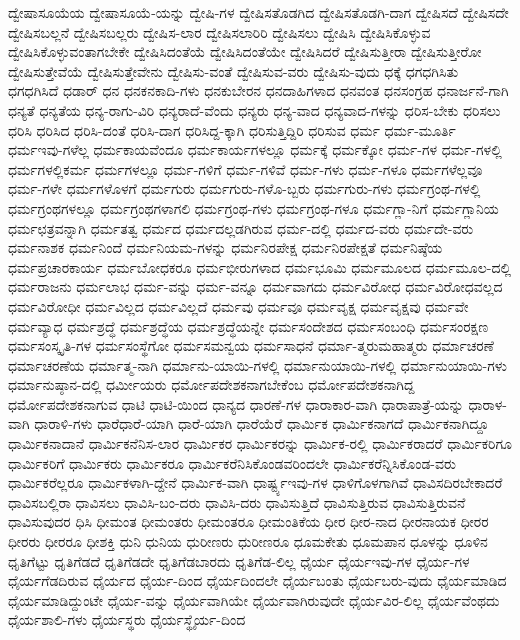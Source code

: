 {ದ್ವೇಷಾಸೂಯೆಯ
ದ್ವೇಷಾಸೂಯೆ-ಯನ್ನು
ದ್ವೇಷಿ-ಗಳ
ದ್ವೇಷಿಸತೊಡಗಿದ
ದ್ವೇಷಿಸತೊಡಗಿ-ದಾಗ
ದ್ವೇಷಿಸದೆ
ದ್ವೇಷಿಸದೇ
ದ್ವೇಷಿಸಬಲ್ಲನೆ
ದ್ವೇಷಿಸಬಲ್ಲರು
ದ್ವೇಷಿಸ-ಲಾರ
ದ್ವೇಷಿಸಲಾರಿರಿ
ದ್ವೇಷಿಸಲು
ದ್ವೇಷಿಸಿ
ದ್ವೇಷಿಸಿಕೊಳ್ಳುವ
ದ್ವೇಷಿಸಿಕೊಳ್ಳುವಂತಾಗಬೇಕೇ
ದ್ವೇಷಿಸಿದಂತೆಯೆ
ದ್ವೇಷಿಸಿದಂತೆಯೇ
ದ್ವೇಷಿಸಿದರೆ
ದ್ವೇಷಿಸುತ್ತೀರಾ
ದ್ವೇಷಿಸುತ್ತೀರೋ
ದ್ವೇಷಿಸುತ್ತೇವೆಯೆ
ದ್ವೇಷಿಸುತ್ತೇವೇನು
ದ್ವೇಷಿಸು-ವಂತೆ
ದ್ವೇಷಿಸುವ-ವರು
ದ್ವೇಷಿಸು-ವುದು
ಧಕ್ಕೆ
ಧಗಧಗಿಸಿತು
ಧಗಧಗಿಸಿದೆ
ಧಡಾರ್
ಧನ
ಧನಕನಕಾದಿ-ಗಳು
ಧನಕುಬೇರನ
ಧನದಾಹಿಗಳಾದ
ಧನವಂತ
ಧನಸಂಗ್ರಹ
ಧನಾರ್ಜನೆ-ಗಾಗಿ
ಧನ್ಯತೆ
ಧನ್ಯತೆಯ
ಧನ್ಯ-ರಾಗು-ವಿರಿ
ಧನ್ಯರಾದೆ-ವೆಂದು
ಧನ್ಯರು
ಧನ್ಯ-ವಾದ
ಧನ್ಯವಾದ-ಗಳನ್ನು
ಧರಿಸ-ಬೇಕು
ಧರಿಸಲು
ಧರಿಸಿ
ಧರಿಸಿದ
ಧರಿಸಿ-ದಂತೆ
ಧರಿಸಿ-ದಾಗ
ಧರಿಸಿದ್ದ-ಕ್ಕಾಗಿ
ಧರಿಸುತ್ತಿದ್ದಿರಿ
ಧರಿಸುವ
ಧರ್ಮ
ಧರ್ಮ-ಮೂರ್ತಿ
ಧರ್ಮಇವು-ಗಳೆಲ್ಲ
ಧರ್ಮಕಾಯವೆಂದೂ
ಧರ್ಮಕಾರ್ಯಗಳಲ್ಲೂ
ಧರ್ಮಕ್ಕೆ
ಧರ್ಮಕ್ಕೋ
ಧರ್ಮ-ಗಳ
ಧರ್ಮ-ಗಳಲ್ಲಿ
ಧರ್ಮಗಳಲ್ಲಿಕರ್ಮ
ಧರ್ಮಗಳಲ್ಲೂ
ಧರ್ಮ-ಗಳಿಗೆ
ಧರ್ಮ-ಗಳಿವೆ
ಧರ್ಮ-ಗಳು
ಧರ್ಮ-ಗಳೂ
ಧರ್ಮಗಳೆಲ್ಲವೂ
ಧರ್ಮ-ಗಳೇ
ಧರ್ಮಗಳೊಳಗೆ
ಧರ್ಮಗುರು
ಧರ್ಮಗುರು-ಗಳೊ-ಬ್ಬರು
ಧರ್ಮಗುರು-ಗಳು
ಧರ್ಮಗ್ರಂಥ-ಗಳಲ್ಲಿ
ಧರ್ಮಗ್ರಂಥಗಳಲ್ಲೂ
ಧರ್ಮಗ್ರಂಥಗಳಾಗಲಿ
ಧರ್ಮಗ್ರಂಥ-ಗಳು
ಧರ್ಮಗ್ರಂಥ-ಗಳೂ
ಧರ್ಮಗ್ಲಾ-ನಿಗೆ
ಧರ್ಮಗ್ಲಾನಿಯ
ಧರ್ಮಛತ್ರವನ್ನಾಗಿ
ಧರ್ಮತತ್ವ
ಧರ್ಮದ
ಧರ್ಮದಲ್ಲಡಗಿರುವ
ಧರ್ಮ-ದಲ್ಲಿ
ಧರ್ಮದ-ವರು
ಧರ್ಮದೇ-ವರು
ಧರ್ಮನಾಶಕ
ಧರ್ಮನಿಂದೆ
ಧರ್ಮನಿಯಮ-ಗಳನ್ನು
ಧರ್ಮನಿರಪೇಕ್ಷ
ಧರ್ಮನಿರಪೇಕ್ಷತೆ
ಧರ್ಮನಿಷ್ಠೆಯ
ಧರ್ಮಪ್ರಚಾರಕಾರ್ಯ
ಧರ್ಮಬೋಧಕರೂ
ಧರ್ಮಭೀರುಗಳಾದ
ಧರ್ಮಭೂಮಿ
ಧರ್ಮಮೂಲದ
ಧರ್ಮಮೂಲ-ದಲ್ಲಿ
ಧರ್ಮರಾಜನು
ಧರ್ಮಲಾಭ
ಧರ್ಮ-ವನ್ನು
ಧರ್ಮ-ವನ್ನೂ
ಧರ್ಮವಾಗದು
ಧರ್ಮವಿರೋಧ
ಧರ್ಮವಿರೋಧವಲ್ಲದ
ಧರ್ಮವಿರೋಧೀ
ಧರ್ಮವಿಲ್ಲದ
ಧರ್ಮವಿಲ್ಲದೆ
ಧರ್ಮವು
ಧರ್ಮವೂ
ಧರ್ಮವೃಕ್ಷ
ಧರ್ಮವೃಕ್ಷವು
ಧರ್ಮವೇ
ಧರ್ಮವ್ಯಾಧ
ಧರ್ಮಶ್ರದ್ಧೆ
ಧರ್ಮಶ್ರದ್ಧೆಯ
ಧರ್ಮಶ್ರದ್ಧೆಯನ್ನೇ
ಧರ್ಮಸಂದೇಶದ
ಧರ್ಮಸಂಬಂಧಿ
ಧರ್ಮಸಂರಕ್ಷಣ
ಧರ್ಮಸಂಸ್ಕೃತಿ-ಗಳ
ಧರ್ಮಸಂಸ್ಥೆಗೋ
ಧರ್ಮಸಮನ್ವಯ
ಧರ್ಮಸಾಧನೆ
ಧರ್ಮಾ-ತ್ಮರುಮಹಾತ್ಮರು
ಧರ್ಮಾಚರಣೆ
ಧರ್ಮಾಚರಣೆಯ
ಧರ್ಮಾತ್ಮ-ನಾಗಿ
ಧರ್ಮಾನು-ಯಾಯಿ-ಗಳಲ್ಲಿ
ಧರ್ಮಾನುಯಾಯಿ-ಗಳಲ್ಲಿ
ಧರ್ಮಾನುಯಾಯಿ-ಗಳು
ಧರ್ಮಾನುಷ್ಠಾನ-ದಲ್ಲಿ
ಧರ್ಮೀಯರು
ಧರ್ಮೋಪದೇಶಕನಾಗಬೇಕೆಂಬ
ಧರ್ಮೋಪದೇಶಕನಾಗಿದ್ದ
ಧರ್ಮೋಪದೇಶಕನಾಗುವ
ಧಾಟಿ
ಧಾಟಿ-ಯಿಂದ
ಧಾನ್ಯದ
ಧಾರಣೆ-ಗಳ
ಧಾರಾಕಾರ-ವಾಗಿ
ಧಾರಾಪಾತ್ರೆ-ಯನ್ನು
ಧಾರಾಳ-ವಾಗಿ
ಧಾರಾಳಿ-ಗಳು
ಧಾರೆಧಾರೆ-ಯಾಗಿ
ಧಾರೆ-ಯಾಗಿ
ಧಾರೆಯೆರೆ
ಧಾರ್ಮಿಕ
ಧಾರ್ಮಿಕನಾಗದೆ
ಧಾರ್ಮಿಕನಾಗಿದ್ದೂ
ಧಾರ್ಮಿಕನಾದಾನೆ
ಧಾರ್ಮಿಕನೆನಿಸ-ಲಾರ
ಧಾರ್ಮಿಕರ
ಧಾರ್ಮಿಕರನ್ನು
ಧಾರ್ಮಿಕ-ರಲ್ಲಿ
ಧಾರ್ಮಿಕರಾದರೆ
ಧಾರ್ಮಿಕರಿಗೂ
ಧಾರ್ಮಿಕರಿಗೆ
ಧಾರ್ಮಿಕರು
ಧಾರ್ಮಿಕರೂ
ಧಾರ್ಮಿಕರೆನಿಸಿಕೊಂಡವರಿಂದಲೇ
ಧಾರ್ಮಿಕರೆನ್ನಿಸಿಕೊಂಡ-ವರು
ಧಾರ್ಮಿಕರೆಲ್ಲರೂ
ಧಾರ್ಮಿಕಳಾಗಿ-ದ್ದೇನೆ
ಧಾರ್ಮಿಕ-ವಾಗಿ
ಧಾರ್ಷ್ಟ್ಯಇವು-ಗಳ
ಧಾಳಿಗೊಳಗಾಗಿವೆ
ಧಾವಿಸದಿರಬೇಕಾದರೆ
ಧಾವಿಸಬಲ್ಲಿರಾ
ಧಾವಿಸಲು
ಧಾವಿಸಿ-ಬಂ-ದರು
ಧಾವಿಸಿ-ದರು
ಧಾವಿಸುತ್ತಿದೆ
ಧಾವಿಸುತ್ತಿರುವ
ಧಾವಿಸುತ್ತಿರುವನೆ
ಧಾವಿಸುವುದರ
ಧಿಸಿ
ಧೀಮಂತ
ಧೀಮಂತರು
ಧೀಮಂತರೂ
ಧೀಮಂತಿಕೆಯ
ಧೀರ
ಧೀರ-ನಾದ
ಧೀರನಾಯಕ
ಧೀರರ
ಧೀರರು
ಧೀರರೂ
ಧೀಶಕ್ತಿ
ಧುನಿ
ಧುನಿಯ
ಧುರೀಣರು
ಧುರೀಣರೂ
ಧೂಮಕೇತು
ಧೂಮಪಾನ
ಧೂಳನ್ನು
ಧೂಳಿನ
ಧೃತಿಗೆಟ್ಟು
ಧೃತಿಗೆಡದೆ
ಧೃತಿಗೆಡದೇ
ಧೃತಿಗೆಡಬಾರದು
ಧೃತಿಗೆಡ-ಲಿಲ್ಲ
ಧೈರ್ಯ
ಧೈರ್ಯಇವು-ಗಳ
ಧೈರ್ಯ-ಗಳ
ಧೈರ್ಯಗೆಡದಿರುವ
ಧೈರ್ಯದ
ಧೈರ್ಯ-ದಿಂದ
ಧೈರ್ಯದಿಂದಲೇ
ಧೈರ್ಯಬಂತು
ಧೈರ್ಯಬರು-ವುದು
ಧೈರ್ಯಮಾಡಿದ
ಧೈರ್ಯಮಾಡಿದ್ದುಂಟೇ
ಧೈರ್ಯ-ವನ್ನು
ಧೈರ್ಯವಾಗಿಯೇ
ಧೈರ್ಯವಾಗಿರುವುದೇ
ಧೈರ್ಯವಿರ-ಲಿಲ್ಲ
ಧೈರ್ಯವೆಂಥದು
ಧೈರ್ಯಶಾಲಿ-ಗಳು
ಧೈರ್ಯಸ್ಥರು
ಧೈರ್ಯಸ್ಥೈರ್ಯ-ದಿಂದ
}
